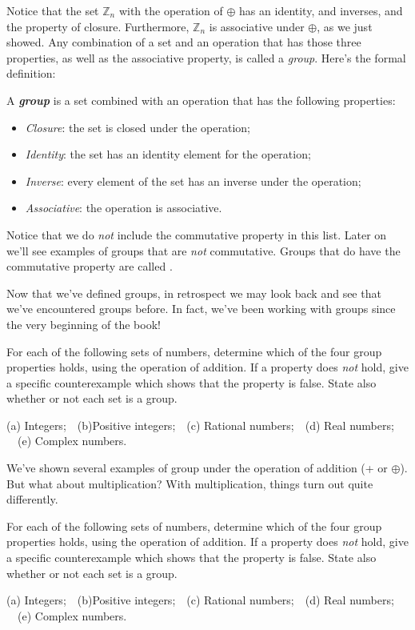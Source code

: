 Notice that the set ${\mathbb Z}_n$ with the operation of $\oplus$ has an identity, and inverses, and the property of closure. Furthermore, ${\mathbb Z}_n$ is associative under $\oplus$, as we just showed.  Any combination of a set and an operation that has those three properties, as well as the associative property, is called a \emph{group}. Here's the formal definition:

\begin{defn} \label{definition:modular:group} A \textbf{\textit{group}} is a set combined with an operation that has the following properties:
\begin{itemize}
\item \emph{Closure}: the set is closed under the operation;
\item \emph{Identity}: the set has an identity element for the operation;
\item \emph{Inverse}: every element of the set has an inverse under the operation;
\item \emph{Associative}: the operation is associative.
\end{itemize}
\end{defn}

\noindent
Notice that we do  \emph{not} include the commutative property in this list. Later on we'll see examples of groups that are \emph{not} commutative. Groups that do have the commutative property are called . 

Now that we've defined groups, in retrospect we may look back and see that we've encountered groups before. In fact, we've been working with groups since the very beginning of the book! 

\begin{exercise}{}
For each of the following sets of numbers, determine which of the four group properties holds, using the operation of addition. If a property does \emph{not} hold, give a specific counterexample which shows that the property is false. State also whether or not each set is a group.

\noindent (a) Integers;~~(b)Positive integers;~~(c) Rational numbers;~~(d) Real numbers; ~~(e) Complex numbers.
\end{exercise}


We've shown several examples of group under the operation of addition (+ or $\oplus$). But what about multiplication? With multiplication, things turn out quite differently.


\begin{exercise}{}
For each of the following sets of numbers, determine which of the four group properties holds, using the operation of addition. If a property does \emph{not} hold, give a specific counterexample which shows that the property is false. State also whether or not each set is a group.

\noindent (a) Integers;~~(b)Positive integers;~~(c) Rational numbers;~~(d) Real numbers; ~~(e) Complex numbers.
\end{exercise}

